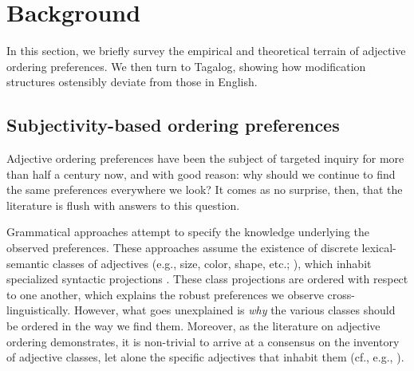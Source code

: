 \documentclass[12pt,letterpaper]{article}
\begin{document}
\section{Background} \label{background}

In this section, we briefly survey the empirical and theoretical terrain of adjective ordering preferences. We then turn to Tagalog, showing how modification structures ostensibly deviate from those in English.

\subsection{Subjectivity-based ordering preferences}

Adjective ordering preferences have been the subject of targeted inquiry for more than half a century now, and with good reason: why should we continue to find the same preferences everywhere we look? It comes as no surprise, then, that the literature is flush with answers to this question.

Grammatical approaches attempt to specify the knowledge underlying the observed preferences. These approaches assume the existence of discrete lexical-semantic classes of adjectives (e.g., size, color, shape, etc.; \citealp{dixon1982}), which inhabit specialized syntactic projections \citep{Cinque1994,Scott2002,laenzlinger2005}. These class projections are ordered with respect to one another, which explains the robust preferences we observe cross-linguistically. However, what goes unexplained is \emph{why} the various classes should be ordered in the way we find them. Moreover, as the literature on adjective ordering demonstrates, it is non-trivial to arrive at a consensus on the inventory of adjective classes, let alone the specific adjectives that inhabit them (cf., e.g., \citealp{dixon1982,kingsburywellman1986,sproatshih1991,scott1998}).

\end{document}
